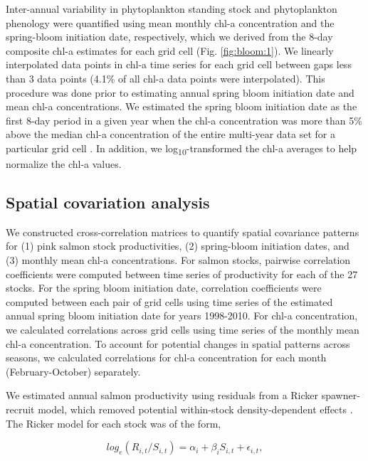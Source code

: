 Inter-annual variability in phytoplankton standing stock and phytoplankton
phenology were quantified using mean monthly chl-a concentration and the
spring-bloom initiation date, respectively, which we derived from the 8-day
composite chl-a estimates for each grid cell (Fig. \ref{fig:bloom:1}). We
linearly interpolated data points in chl-a time series for each grid cell
between gaps less than 3 data points (4.1\% of all chl-a data points were
interpolated). This procedure was done prior to estimating annual spring bloom
initiation date and mean chl-a concentrations. We estimated the spring bloom
initiation date as the first 8-day period in a given year when the chl-a
concentration was more than 5\% above the median chl-a concentration of the
entire multi-year data set for a particular grid cell \citep{Siegel2002a,
Henson2007a}. In addition, we log\textsubscript{10}-transformed the chl-a
averages to help normalize the chl-a values.


\subsection{Spatial covariation analysis}

We constructed cross-correlation matrices to quantify spatial covariance
patterns for (1) pink salmon stock productivities, (2) spring-bloom initiation
dates, and (3) monthly mean chl-a concentrations. For salmon stocks, pairwise
correlation coefficients were computed between time series of productivity for
each of the 27 stocks. For the spring bloom initiation date, correlation
coefficients were computed between each pair of grid cells using time series of
the estimated annual spring bloom initiation date for years 1998-2010. For chl-a
concentration, we calculated correlations across grid cells using time series of
the monthly mean chl-a concentration. To account for potential changes in
spatial patterns across seasons, we calculated correlations for chl-a
concentration for each month (February-October) separately.

We estimated annual salmon productivity using residuals from a Ricker
spawner-recruit model, which removed potential within-stock density-dependent
effects \citep{Pyper2001a, Mueter2002a, Ricker1954a}.  The Ricker model for each
stock was of the form,

\begin{equation}
log_e(R_{i,t} / S_{i,t}) = \alpha_i + \beta_i S_{i,t} + \epsilon_{i,t},
\label{eq:bloom:1}
\end{equation}

